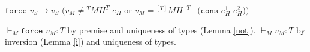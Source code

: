 \begin{case}

$\mathtt{force}$ $v_{S}\rightarrow v_{S}$ $(v_{M}\neq{^{T}M}H^{T}$ $e_{H}$ or $v_{M}={^{[T]}M}H^{[T]}$ $(\mathtt{cons}$ $e_{H}^{1}$ $e_{H}^{2}))$

$\vdash_{M}\mathtt{force}$ $v_{M}:T$ by premise and uniqueness of types (Lemma \ref{uot}).  $\vdash_{M}v_{M}:T$ by inversion (Lemma \ref{i}) and uniqueness of types.

\end{case}
